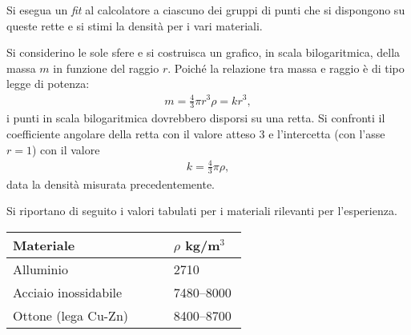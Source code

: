 \documentclass{lab1-article}
\begin{document}
\begin{article}
Si esegua un \emph{fit} al calcolatore a ciascuno dei gruppi di punti che
si dispongono su queste rette e si stimi la densit\`a per i vari materiali.



Si considerino le sole sfere e si costruisca un grafico, in scala
bilogaritmica, della massa $m$ in funzione del raggio $r$. Poich\'e la relazione
tra massa e raggio \`e di tipo legge di potenza:
\begin{align}
  m = \frac{4}{3}\pi r^3 \rho = kr^3,
\end{align}
i punti in scala bilogaritmica dovrebbero disporsi su una retta.
Si confronti il coefficiente angolare della retta con il valore atteso
$3$ e l'intercetta (con l'asse $r = 1$) con il valore
\begin{align}
  k = \frac{4}{3}\pi\rho,
\end{align}
data la densit\`a misurata precedentemente.



Si riportano di seguito i valori tabulati per i materiali rilevanti
per l'esperienza.

\medskip

\begin{center}
  \begin{tabular}{p{0.65\linewidth}@{}p{0.3\linewidth}}
    \hline
    Materiale & $\rho$ kg/m$^3$\\
    \hline
    \hline
    Alluminio & 2710\\
    Acciaio inossidabile  & 7480--8000\\
    Ottone (lega Cu-Zn)   & 8400--8700\\
    \hline
  \end{tabular}
\end{center}

\onecolumn




\end{article}
\end{document}
